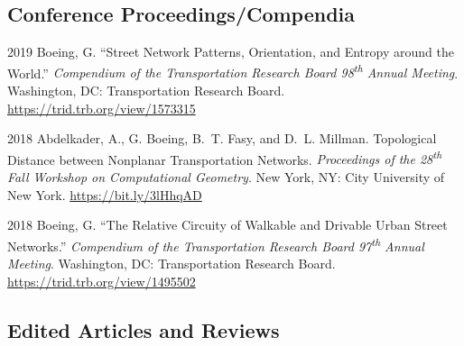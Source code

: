 \documentclass[12pt,letterpaper]{report}
\begin{document}
    \subsection*{Conference Proceedings/Compendia}

    \begin{tablist}

        \item[2019] \tab Boeing, G. \enquote{Street Network Patterns, Orientation, and Entropy around the World.} \textit{Compendium of the Transportation Research Board 98\textsuperscript{th} Annual Meeting}. Washington, DC: Transportation Research Board. \href{https://trid.trb.org/view/1573315}{https://trid.trb.org/view/1573315}

        \item[2018] \tab Abdelkader, A., G. Boeing, B.~T. Fasy, and D.~L. Millman. Topological Distance between Nonplanar Transportation Networks. \textit{Proceedings of the 28\textsuperscript{th} Fall Workshop on Computational Geometry}. New York, NY: City University of New York. \href{https://bit.ly/3lHhqAD}{https://bit.ly/3lHhqAD}

        \item[2018] \tab Boeing, G. \enquote{The Relative Circuity of Walkable and Drivable Urban Street Networks.} \textit{Compendium of the Transportation Research Board 97\textsuperscript{th} Annual Meeting}. Washington, DC: Transportation Research Board. \href{https://trid.trb.org/view/1495502}{https://trid.trb.org/view/1495502}

    \end{tablist}



    \subsection*{Edited Articles and Reviews}
\end{document}
